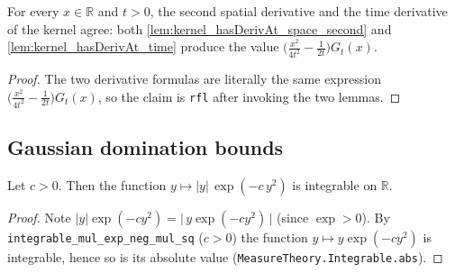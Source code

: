 \begin{lemma}
    \label{lem:kernel_heat_identity}
    \leanok
    For every $x \in \mathbb{R}$ and $t > 0$, the second spatial derivative and the
    time derivative of the kernel agree: both
    \cref{lem:kernel_hasDerivAt_space_second} and \cref{lem:kernel_hasDerivAt_time}
    produce the value $\bigl(\tfrac{x^2}{4t^2} - \tfrac{1}{2t}\bigr) G_t(x)$.
\end{lemma}
\begin{proof}
    The two derivative formulas are literally the same expression
    $\bigl(\tfrac{x^2}{4t^2} - \tfrac{1}{2t}\bigr) G_t(x)$, so the claim is
    \texttt{rfl} after invoking the two lemmas.
\end{proof}

\subsection{Gaussian domination bounds}

\begin{lemma}
    \label{lem:integrable_abs_mul_gaussian}
    \leanok
    Let $c > 0$. Then the function $y \mapsto \lvert y\rvert\,\exp(-c\,y^2)$ is
    integrable on $\mathbb{R}$.
\end{lemma}
\begin{proof}
    Note $\lvert y\rvert\exp(-cy^2) = \lvert\, y\exp(-cy^2)\,\rvert$ (since
    $\exp > 0$). By \texttt{integrable\_mul\_exp\_neg\_mul\_sq} ($c > 0$) the function
    $y \mapsto y\exp(-cy^2)$ is integrable, hence so is its absolute value
    (\texttt{MeasureTheory.Integrable.abs}).
\end{proof}

